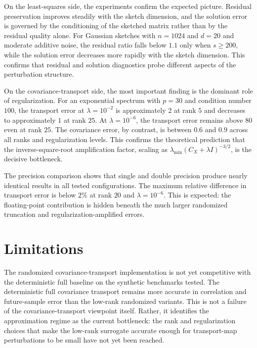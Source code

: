 On the least-squares side, the experiments confirm the expected picture.
Residual preservation improves steadily with the sketch dimension, and the
solution error is governed by the conditioning of the sketched matrix rather
than by the residual quality alone. For Gaussian sketches with \(n=1024\) and
\(d=20\) and moderate additive noise, the residual ratio falls below \(1.1\)
only when \(s \ge 200\), while the solution error decreases more rapidly with
the sketch dimension. This confirms that residual and solution diagnostics
probe different aspects of the perturbation structure.

On the covariance-transport side, the most important finding is the dominant
role of regularization. For an exponential spectrum with \(p=30\) and
condition number \(100\), the transport error at \(\lambda = 10^{-2}\) is
approximately \(2\) at rank \(5\) and decreases to approximately \(1\) at rank
\(25\). At \(\lambda = 10^{-6}\), the transport error remains above \(80\) even
at rank \(25\). The covariance error, by contrast, is between \(0.6\) and
\(0.9\) across all ranks and regularization levels. This confirms the
theoretical prediction that the inverse-square-root amplification factor,
scaling as \(\lambda_{\min}(C_X+\lambda I)^{-3/2}\), is the decisive
bottleneck.

The precision comparison shows that single and double precision produce
nearly identical results in all tested configurations. The maximum relative
difference in transport error is below \(2\%\) at rank \(20\) and
\(\lambda = 10^{-6}\). This is expected: the floating-point contribution is
hidden beneath the much larger randomized truncation and
regularization-amplified errors.

\section*{Limitations}

The randomized covariance-transport implementation is not yet competitive
with the deterministic full baseline on the synthetic benchmarks tested. The
deterministic full covariance transport remains more accurate in correlation
and future-sample error than the low-rank randomized variants. This is not a
failure of the covariance-transport viewpoint itself. Rather, it identifies the
approximation regime as the current bottleneck: the rank and regularization
choices that make the low-rank surrogate accurate enough for transport-map
perturbations to be small have not yet been reached.

